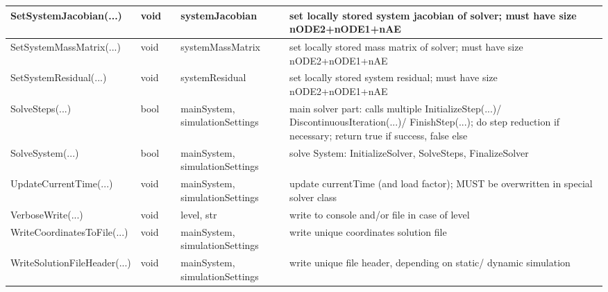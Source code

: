 \begin{center}
\begin{longtable}{| p{4.2cm} | p{2.5cm} | p{0.3cm} | p{3.0cm} | p{6cm} |}
    SetSystemJacobian(...) &     void &      &     systemJacobian &     set locally stored system jacobian of solver; must have size nODE2+nODE1+nAE\\ \hline
    SetSystemMassMatrix(...) &     void &      &     systemMassMatrix &     set locally stored mass matrix of solver; must have size nODE2+nODE1+nAE\\ \hline
    SetSystemResidual(...) &     void &      &     systemResidual &     set locally stored system residual; must have size nODE2+nODE1+nAE\\ \hline
    SolveSteps(...) &     bool &      &     mainSystem, simulationSettings &     main solver part: calls multiple InitializeStep(...)/ DiscontinuousIteration(...)/ FinishStep(...); do step reduction if necessary; return true if success, false else\\ \hline
    SolveSystem(...) &     bool &      &     mainSystem, simulationSettings &     solve System: InitializeSolver, SolveSteps, FinalizeSolver\\ \hline
    UpdateCurrentTime(...) &     void &      &     mainSystem, simulationSettings &     update currentTime (and load factor); MUST be overwritten in special solver class\\ \hline
    VerboseWrite(...) &     void &      &     level, str &     write to console and/or file in case of level\\ \hline
    WriteCoordinatesToFile(...) &     void &      &     mainSystem, simulationSettings &     write unique coordinates solution file\\ \hline
    WriteSolutionFileHeader(...) &     void &      &     mainSystem, simulationSettings &     write unique file header, depending on static/ dynamic simulation\\ \hline
	  \end{longtable}
	\end{center}



